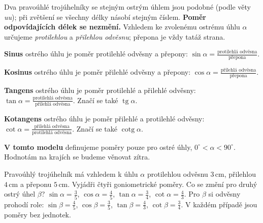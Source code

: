 \documentclass[11pt,a4paper]{article}
\begin{document}
Dva pravoúhlé trojúhelníky se stejným ostrým úhlem jsou podobné
(podle věty \emph{uu}); při zvětšení se všechny délky násobí stejným
číslem. \textbf{Poměr odpovídajících délek se nezmění.}
Vzhledem ke zvolenému ostrému úhlu $\alpha$ určujeme \emph{protilehlou}
a \emph{přilehlou odvěsnu}; přepona je vždy tatáž strana.
\begin{definiceBox}[title={Definice - Sinus ostrého úhlu}]
\textbf{Sinus} ostrého úhlu je poměr protilehlé odvěsny a přepony:
$\displaystyle \sin\alpha=\frac{\text{protilehlá odvěsna}}{\text{přepona}}$.
\end{definiceBox}
\begin{definiceBox}[title={Definice - Kosinus ostrého úhlu}]
\textbf{Kosinus} ostrého úhlu je poměr přilehlé odvěsny a přepony:
$\displaystyle \cos\alpha=\frac{\text{přilehlá odvěsna}}{\text{přepona}}$.
\end{definiceBox}
\begin{definiceBox}[title={Definice - Tangens ostrého úhlu}]
\textbf{Tangens} ostrého úhlu je poměr protilehlé a přilehlé odvěsny:
$\displaystyle \tan\alpha=\frac{\text{protilehlá odvěsna}}{\text{přilehlá odvěsna}}$.
Značí se také $\operatorname{tg}\alpha$.
\end{definiceBox}
\begin{definiceBox}[title={Definice - Kotangens ostrého úhlu}]
\textbf{Kotangens} ostrého úhlu je poměr přilehlé a protilehlé odvěsny:
$\displaystyle \cot\alpha=\frac{\text{přilehlá odvěsna}}{\text{protilehlá odvěsna}}$.
Značí se také $\operatorname{cotg}\alpha$.
\end{definiceBox}
\textbf{V tomto modelu} definujeme poměry pouze pro ostré úhly,
$0^\circ<\alpha<90^\circ$. Hodnotám na krajích se budeme věnovat zítra.

\begin{prikladReseniBox}[title={Příklad 1},breakable=false]
Pravoúhlý trojúhelník má vzhledem k úhlu $\alpha$ protilehlou odvěsnu $3\,\mathrm{cm}$,
přilehlou $4\,\mathrm{cm}$ a přeponu $5\,\mathrm{cm}$.
Vyjádři čtyři goniometrické poměry. Co se změní pro druhý ostrý úhel $\beta$?
\tcblower
$\sin\alpha=\frac35$, $\cos\alpha=\frac45$, $\tan\alpha=\frac34$,
$\cot\alpha=\frac43$. Pro $\beta$ si odvěsny prohodí role:
$\sin\beta=\frac45$, $\cos\beta=\frac35$, $\tan\beta=\frac43$,
$\cot\beta=\frac34$. V každém případě jsou poměry bez jednotek.
\end{prikladReseniBox}
\end{document}
